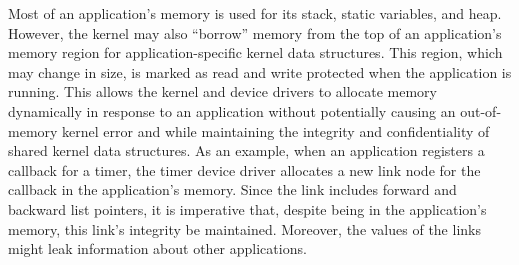 Most of an
application's memory is
used for its stack, static variables, and heap. However,
the kernel may also ``borrow'' memory from the top of an application's memory
region for application-specific kernel data structures. This region, which may
change in size,
is marked
as read and write protected when the application is running. This allows the
kernel and device drivers to allocate memory dynamically in response to an
application without
potentially causing an out-of-memory kernel error and while
maintaining the integrity and
confidentiality of shared kernel data structures. As an example, when an
application registers a callback for a timer, the timer device driver
allocates a new link node for the callback in the application's memory.
Since the link includes forward and backward list
pointers, it is imperative that, despite being in the application's memory,
this link's integrity be maintained. Moreover, the values of the links might
leak information about other applications.

